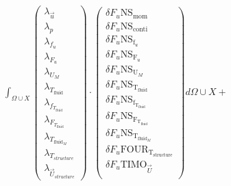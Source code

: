 \documentclass[10pt]{article} %
\begin{document}
\begin{center}
	$\int_{\Omega \cup X}
	\begin{pmatrix}
		\lambda_{\vec{u}} \\ \lambda_p \\ \lambda_{f_u} \\ \lambda_{F_u} \\ \lambda_{U_M}\\ \lambda_{T_{\text{fluid}}} \\ \lambda_{f_{T_{\text{fluid}}}} \\ \lambda_{F_{T_{\text{fluid}}}} \\ \lambda_{T_{\text{fluid}_M}} \\ \lambda_{T_{structure}} \\ \lambda_{\vec{U}_{structure}}
	\end{pmatrix}
	\cdot
	\begin{pmatrix}
		\delta F_u \text{NS}_{\text{mom}} \\
		\delta F_u \text{NS}_{\text{conti}}\\
		\delta F_u \text{NS}_{\text{f}_u} \\
		\delta F_u \text{NS}_{\text{F}_u} \\
		\delta F_u \text{NS}_{\text{U}_M} \\
		\delta F_u \text{NS}_{\text{T}_{\text{fluid}}} \\
		\delta F_u \text{NS}_{\text{f}_{\text{T}_{\text{fluid}}}}\\
		\delta F_u \text{NS}_{\text{F}_{\text{T}_{\text{fluid}}}}\\
		\delta F_u \text{NS}_{\text{T}_{\text{fluid}_M}}\\
		\delta F_u \text{FOUR}_{\text{T}_{\text{structure}}}\\
		\delta F_u \text{TIMO}_{\vec{U}}\\
	\end{pmatrix}
	d\Omega \cup X + $\\


\end{center}
\end{document}
